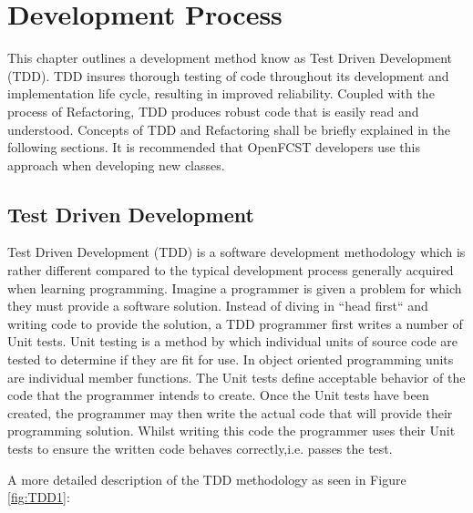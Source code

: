 \chapter{Development Process}

This chapter outlines a development method know as Test Driven Development (TDD). TDD insures thorough testing of code throughout its development and implementation life cycle, resulting in improved reliability. Coupled with the process of Refactoring, TDD produces robust code that is easily read and understood. Concepts of TDD and Refactoring shall be briefly explained in the following sections. It is recommended that OpenFCST developers use this approach when developing new classes.

\section{Test Driven Development}
    
Test Driven Development (TDD) is a software development methodology which is rather different compared to the typical development process generally acquired when learning programming. Imagine a programmer is given a problem for which they must provide a software solution. Instead of diving in ``head first`` and writing code to provide the solution, a TDD programmer first writes a number of Unit tests. Unit testing is a method by which individual units of source code are tested to determine if they are fit for use. In object oriented programming units are individual member functions.  The Unit tests define acceptable behavior of the code that the programmer intends to create. Once the Unit tests have been created, the programmer may then write the actual code that will provide their programming solution. Whilst writing this code the programmer uses their Unit tests to ensure the written code behaves correctly,i.e. passes the test.
     
A more detailed description of the TDD methodology as seen in Figure \ref{fig:TDD1}:

